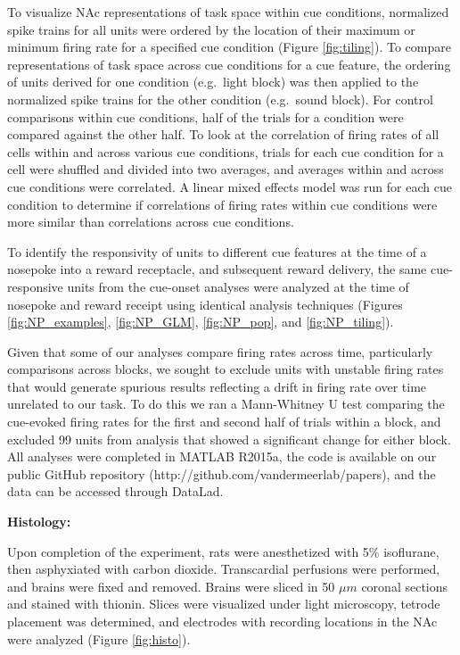 \documentclass[11pt]{article}
\begin{document}
{To visualize NAc representations of task space within cue conditions, normalized
spike trains for all units were ordered by the location of their maximum or
minimum firing rate for a specified cue condition (Figure \ref{fig:tiling}). To
compare representations of task space across cue conditions for a cue feature,
the ordering of units derived for one condition (e.g.\ light block) was then
applied to the normalized spike trains for the other condition (e.g.\ sound
block). For control comparisons within cue conditions, half of the trials for a
condition were compared against the other half. To look at the correlation of
firing rates of all cells within and across various cue conditions, trials for
each cue condition for a cell were shuffled and divided into two averages, and
averages within and across cue conditions were correlated. A linear mixed
effects model was run for each cue condition to determine if correlations of
firing rates within cue conditions were more similar than correlations across
cue conditions.

To identify the responsivity of units to different cue features at the time of a
nosepoke into a reward receptacle, and subsequent reward delivery, the same
cue-responsive units from the cue-onset analyses were analyzed at the time of
nosepoke and reward receipt using identical analysis techniques (Figures
\ref{fig:NP_examples}, \ref{fig:NP_GLM}, \ref{fig:NP_pop}, and
\ref{fig:NP_tiling}).

Given that some of our analyses compare firing rates across time, particularly
comparisons across blocks, we sought to exclude units with unstable firing rates
that would generate spurious results reflecting a drift in firing rate over time
unrelated to our task. To do this we ran a Mann-Whitney U test comparing the
cue-evoked firing rates for the first and second half of trials within a block,
and excluded 99 units from analysis that showed a significant change for either
block. All analyses were completed in MATLAB R2015a, the code is available on
our public GitHub repository (http://github.com/vandermeerlab/papers), and the
data can be accessed through DataLad.

{\bf Histology:}

Upon completion of the experiment, rats were anesthetized with 5\% isoflurane,
then asphyxiated with carbon dioxide. Transcardial perfusions were performed,
and brains were fixed and removed. Brains were sliced in 50 $\mu m$ coronal
sections and stained with thionin. Slices were visualized under light
microscopy, tetrode placement was determined, and electrodes with recording
locations in the NAc were analyzed (Figure \ref{fig:histo}).

}
\end{document}
